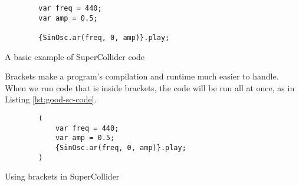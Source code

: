\begin{listing}
	\begin{lstlisting}
		var freq = 440;
		var amp = 0.5;
		
		{SinOsc.ar(freq, 0, amp)}.play;
	\end{lstlisting}
	\caption{A basic example of SuperCollider code}
	\label{lst:basic-sc-code}
\end{listing}


Brackets make a program's compilation and runtime much easier to handle. When we run code that is inside brackets, the code will be run all at once, as in Listing \ref{lst:good-sc-code}. 

\begin{listing}
	\begin{lstlisting}
		(
			var freq = 440;
			var amp = 0.5;
			{SinOsc.ar(freq, 0, amp)}.play;
		)
	\end{lstlisting}
	\caption{Using brackets in SuperCollider}
	\label{lst:good-sc-code}	
\end{listing}